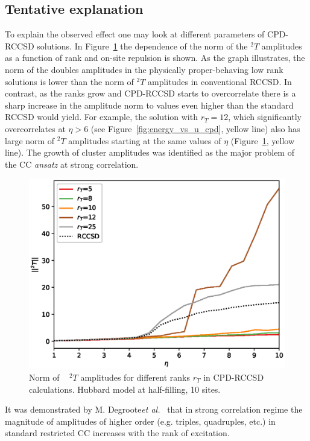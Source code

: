 \subsection{Tentative explanation}
To explain the observed effect one may look at 
different parameters of CPD-RCCSD solutions. In 
Figure~\ref{fig:t2_norms_vs_u_10_sites_cpd_rccsd} the dependence of the norm of 
the 
${}^2T$ amplitudes as a function of rank and on-site repulsion is shown. As the 
graph illustrates, the norm of the doubles amplitudes in the physically 
proper-behaving low rank solutions is lower than the norm of ${}^2T$ amplitudes 
in conventional RCCSD. In contrast, as the ranks grow and CPD-RCCSD starts 
to overcorrelate there is a sharp increase in the amplitude norm to values even 
higher than the standard RCCSD would yield. For example, the solution with 
$r_{T} = 12$, which significantly overcorrelates at $\eta > 6$ (see 
Figure~\ref{fig:energy_vs_u_cpd}, yellow line) also has large 
norm of ${}^2T$ amplitudes starting at the same values of $\eta$ 
(Figure~\ref{fig:t2_norms_vs_u_10_sites_cpd_rccsd}, yellow line). 
The growth of cluster amplitudes was identified as the major problem of the CC 
\emph{ansatz} at strong correlation.\cite{degroote2016polynomial}
%
\begin{figure}[ht]
\includegraphics[width=\columnwidth]
{figures/tcc_strong_correlation/t2_norms_vs_u_10_sites_cpd_rccsd}
\caption{Norm of ~ ${}^2T$ amplitudes for different ranks $r_{T}$ in CPD-RCCSD 
calculations. Hubbard model at half-filling, 10 sites.
\label{fig:t2_norms_vs_u_10_sites_cpd_rccsd}}
\end{figure}
%
It was demonstrated by M. Degroote\emph{et al.}~\cite{degroote2016polynomial} 
that in strong correlation regime the magnitude of amplitudes of higher order 
(e.g. triples, quadruples, etc.) in standard restricted CC increases with 
the rank of excitation.

